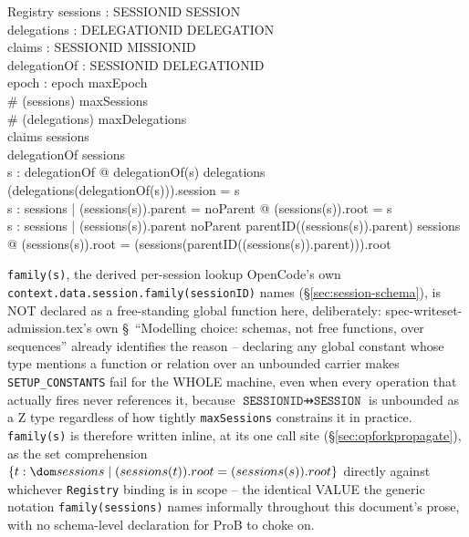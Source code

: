 \documentclass[a4paper,10pt,fleqn]{article}
\newcommand{\field}[1]{\texttt{#1}}
\begin{document}
\begin{schema}{Registry}
sessions : SESSIONID \pfun SESSION \\
delegations : DELEGATIONID \pfun DELEGATION \\
claims : SESSIONID \pfun MISSIONID \\
delegationOf : SESSIONID \pfun DELEGATIONID \\
epoch : \nat
\where
epoch \leq maxEpoch \\
\# (\dom sessions) \leq maxSessions \\
\# (\dom delegations) \leq maxDelegations \\
\dom claims \subseteq \dom sessions \\
\dom delegationOf \subseteq \dom sessions \\
\forall s : \dom delegationOf @
  delegationOf(s) \in \dom delegations \land
  (delegations(delegationOf(s))).session = s \\
\forall s : \dom sessions |
    (sessions(s)).parent = noParent @
  (sessions(s)).root = s \\
\forall s : \dom sessions |
    (sessions(s)).parent \neq noParent \land
    parentID((sessions(s)).parent) \in \dom sessions @
  (sessions(s)).root = (sessions(parentID((sessions(s)).parent))).root
\end{schema}

\field{family(s)}, the derived per-session lookup OpenCode's own
\field{context.data.session.family(sessionID)} names
(\S\ref{sec:session-schema}), is NOT declared as a free-standing
global function here, deliberately: spec-writeset-admission.tex's own
\S~``Modelling choice: schemas, not free functions, over sequences''
already identifies the reason -- declaring any global constant whose
type mentions a function or relation over an unbounded carrier makes
\texttt{SETUP\_CONSTANTS} fail for the WHOLE machine, even when every
operation that actually fires never references it, because $\field{SESSIONID}
\pfun \field{SESSION}$ is unbounded as a Z type regardless of how
tightly \field{maxSessions} constrains it in practice. \field{family(s)}
is therefore written inline, at its one call site
(\S\ref{sec:opforkpropagate}), as the set comprehension
$\{ t : \dom sessions \mid (sessions(t)).root = (sessions(s)).root \}$
directly against whichever \field{Registry} binding is in scope -- the
identical VALUE the generic notation \field{family(sessions)} names
informally throughout this document's prose, with no schema-level
declaration for ProB to choke on.
\end{document}
